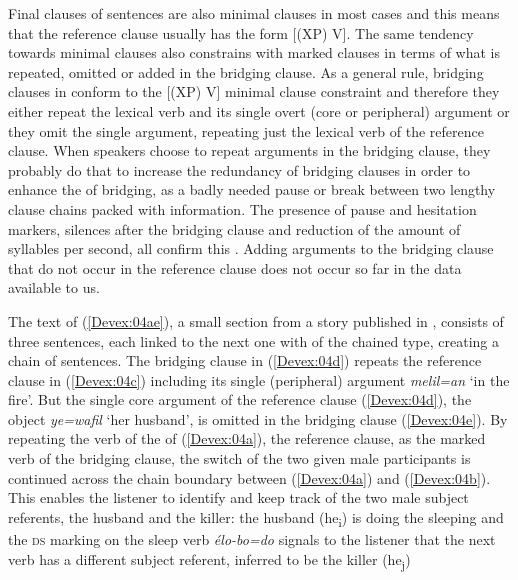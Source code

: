 \documentclass[output=paper]{LSP/langsci}
\begin{document}
Final clauses of sentences are also minimal clauses in most cases and this means that the reference clause usually has the form [(XP) V]. The same tendency towards minimal clauses also constrains  with  marked clauses in terms of what is repeated, omitted or added in the bridging clause. As a general rule, bridging clauses in  conform to the [(XP) V] minimal clause constraint and therefore they either repeat the lexical verb and its single overt (core or peripheral) argument or they omit the single argument, repeating just the lexical verb of the reference clause. When speakers choose to repeat arguments in the bridging clause, they probably do that to increase the redundancy of bridging clauses in order  to enhance the  of bridging, as a badly needed pause or break between two lengthy clause chains packed with information. The presence of pause and hesitation markers, silences after the bridging clause and reduction of the amount of syllables per second, all confirm this . Adding arguments to the bridging clause that do not occur in the reference clause does not occur so far in the data available to us.


The text of (\ref{Devex:04ae}), a small section from a story published in \citealt{enk97}, consists of three sentences, each linked to the next one with  of the chained type, creating a chain of sentences. The bridging clause in (\ref{Devex:04d}) repeats the reference clause in (\ref{Devex:04c}) including its single (peripheral) argument \textit{melil=an} `in the fire'. But the single core argument of the reference clause (\ref{Devex:04d}), the object \textit{ye=wafil} `her husband', is omitted in the bridging clause (\ref{Devex:04e}). By repeating the verb of the  of (\ref{Devex:04a}), the reference clause, as the  marked verb of the bridging clause, the switch  of the two given male participants is continued across the chain boundary between (\ref{Devex:04a}) and (\ref{Devex:04b}). This enables the  listener to identify and keep track of the two male subject referents, the husband and the killer: the husband (he\textsubscript{i}) is doing the sleeping and the \textsc{ds} marking on the sleep verb \textit{élo-bo=do} signals to the listener that the next verb has a different subject referent, inferred to be the killer (he\textsubscript{j})     
\end{document}
